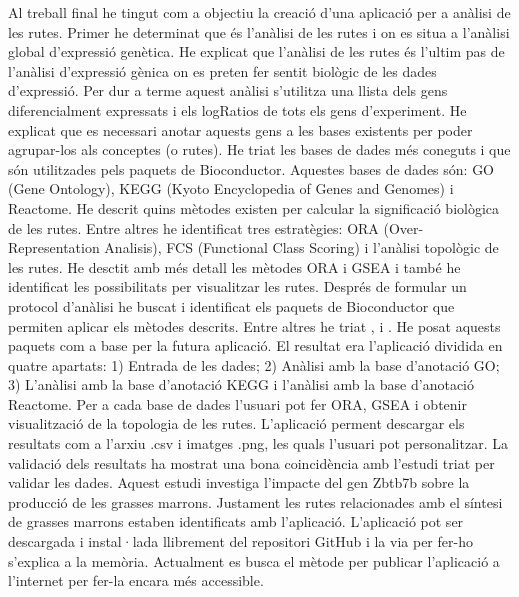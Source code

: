 Al treball final he tingut com a objectiu la creació d'una aplicació per a anàlisi de les rutes. Primer he determinat que és l'anàlisi de les rutes i on es situa a l'anàlisi global d'expressió genètica. He explicat que l'anàlisi de les rutes és l'ultim pas de l'anàlisi d'expressió gènica on es preten fer sentit biològic de les dades d'expressió. Per dur a terme aquest anàlisi s'utilitza una llista dels gens diferencialment expressats i els logRatios de tots els gens d'experiment. He explicat que es necessari anotar aquests gens a les bases existents per poder agrupar-los als conceptes (o rutes). He triat les bases de dades més coneguts i que són utilitzades pels paquets de Bioconductor. Aquestes bases de dades són: GO (Gene Ontology), KEGG (Kyoto Encyclopedia of Genes  and Genomes) i Reactome. He descrit quins mètodes existen per calcular la significació biològica de les rutes. Entre altres he identificat tres estratègies:  ORA (Over-Representation Analisis), FCS (Functional Class Scoring) i l'anàlisi topològic de les rutes. He desctit amb més detall les mètodes ORA i GSEA i també he identificat les possibilitats per visualitzar les rutes.  Després de formular un protocol d'anàlisi he buscat i identificat els paquets de Bioconductor que permiten aplicar els mètodes descrits. Entre altres he triat ,  i . He posat aquests paquets com a base per la futura aplicació. El resultat era l'aplicació dividida en quatre apartats: 1) Entrada de les dades; 2) Anàlisi amb la base d'anotació GO; 3) L'anàlisi amb la base d'anotació KEGG i l'anàlisi amb la base d'anotació Reactome. Per a cada base de dades l'usuari pot fer ORA, GSEA i obtenir visualització de la topologia de les rutes. L'aplicació perment descargar els resultats com a l'arxiu .csv i imatges .png, les quals l'usuari pot personalitzar. La validació dels resultats ha mostrat una bona coincidència amb l'estudi triat per validar les dades.  Aquest estudi investiga l'impacte del gen Zbtb7b sobre la producció de les grasses marrons. Justament les rutes relacionades amb el síntesi de grasses marrons estaben identificats amb l'aplicació. L'aplicació pot ser descargada i instal·lada llibrement del repositori GitHub i la via per fer-ho s'explica a la memòria. Actualment es busca el mètode per publicar l'aplicació a l'internet per fer-la encara més accessible.
 